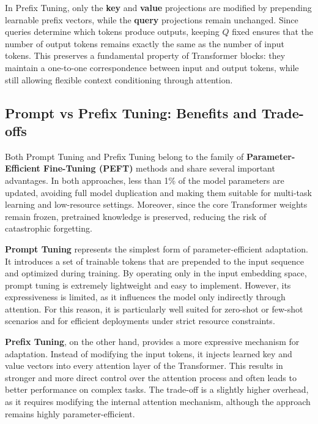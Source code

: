 \begin{infobox}
In Prefix Tuning, only the \textbf{key} and \textbf{value} projections are modified by prepending
learnable prefix vectors, while the \textbf{query} projections remain unchanged.
Since queries determine which tokens produce outputs, keeping $Q$ fixed ensures that the number
of output tokens remains exactly the same as the number of input tokens.  
This preserves a fundamental property of Transformer blocks: they maintain a one-to-one
correspondence between input and output tokens, while still allowing flexible context
conditioning through attention.
\end{infobox}

    

\subsection{Prompt vs Prefix Tuning: Benefits and Trade-offs}
Both Prompt Tuning and Prefix Tuning belong to the family of
\textbf{Parameter-Efficient Fine-Tuning (PEFT)} methods and share several important advantages.
In both approaches, less than 1\% of the model parameters are updated, avoiding full model
duplication and making them suitable for multi-task learning and low-resource settings.
Moreover, since the core Transformer weights remain frozen, pretrained knowledge is preserved,
reducing the risk of catastrophic forgetting.

\textbf{Prompt Tuning} represents the simplest form of parameter-efficient adaptation. It
introduces a set of trainable tokens that are prepended to the input sequence and optimized
during training. By operating only in the input embedding space, prompt tuning is extremely
lightweight and easy to implement. However, its expressiveness is limited, as it influences the
model only indirectly through attention. For this reason, it is particularly well suited for
zero-shot or few-shot scenarios and for efficient deployments under strict resource constraints.

\textbf{Prefix Tuning}, on the other hand, provides a more expressive mechanism for adaptation.
Instead of modifying the input tokens, it injects learned key and value vectors into every
attention layer of the Transformer. This results in stronger and more direct control over the
attention process and often leads to better performance on complex tasks. The trade-off is a
slightly higher overhead, as it requires modifying the internal attention mechanism, although
the approach remains highly parameter-efficient.

